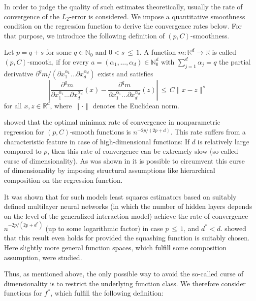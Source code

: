 \documentclass[twoside,11pt]{article}
\newcommand{\rev}[1]{{\color{revisionred}#1}}
\begin{document}
In order to judge the quality of such estimates theoretically, usually the rate of convergence of the \( L_2 \)-error is considered. \rev{We impose a quantitative smoothness condition on the regression function to derive the convergence rates below.} For that purpose, we introduce the following definition of \( (p, C) \)-smoothness.

\begin{definition}
Let \( p = q + s \) for some \( q \in \mathbb{N}_0 \) and \( 0 < s \,\leq\, 1 \). A function \( m : \mathbb{R}^d \rightarrow \mathbb{R} \) is called \( (p, C) \)-smooth, if for every \( a = (\alpha_1, \ldots, \alpha_d) \in \mathbb{N}_0^d \) with \( \sum_{j=1}^d \alpha_j = q \) the partial derivative \( \partial^qm / (\partial x_1^{\alpha_1} \ldots \partial x_d^{\alpha_d}) \) exists and satisfies
\[
\left| \frac{\partial^qm}{\partial x_1^{\alpha_1} \ldots \partial x_d^{\alpha_d}}(x) - \frac{\partial^qm}{\partial x_1^{\alpha_1} \ldots \partial x_d^{\alpha_d}}(z) \right| \,\leq\, C \|x - z\|^s
\]
for all \( x, z \in \mathbb{R}^d \), where \( \| \cdot \| \) denotes the Euclidean norm.
\end{definition}

\cite{stone1982optimal} showed that the optimal minimax rate of convergence in nonparametric regression for \( (p, C) \)-smooth functions is \( n^{-2p/(2p+d)} \). This rate suffers from a characteristic feature in case of high-dimensional functions: If \( d \) is relatively large compared to \( p \), then this rate of convergence can be extremely slow (so-called curse of dimensionality). As was shown in \cite{stone1985additive, stone1994use} it is possible to circumvent this curse of dimensionality by imposing structural assumptions like hierarchical composition on the regression function. 

It was shown that for such models least squares estimators based on suitably defined multilayer neural networks (in which the number of hidden layers depends on the level of the generalized interaction model) achieve the rate of convergence \( n^{-2p/(2p+d^*)} \) (up to some logarithmic factor) in case \( p \,\leq\, 1 \), and $d^* < d$. \cite{bauer2019deep} showed that this result even holds for provided the squashing function is suitably chosen. Here slightly more general function spaces, which fulfill
some composition assumption, were studied.

Thus, as mentioned above, the only possible way to avoid the so-called curse of dimensionality is to restrict the underlying function class. We therefore consider functions for $f^*$, which fulfill the following definition:
\end{document}
